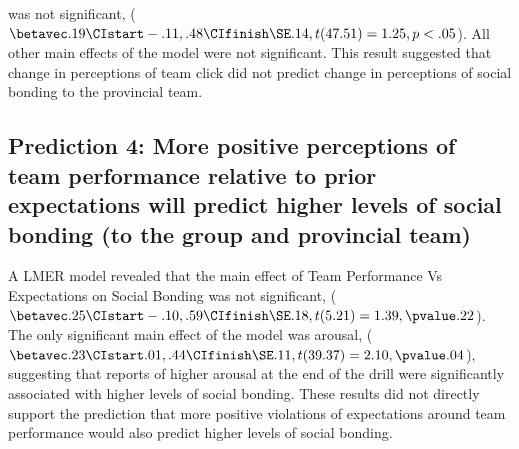 \begin{CJK}{UTF8}{gbsn}
 was not significant, ($\betavec .19 \CIstart -.11, .48 \CIfinish \SE .14, t(47.51) = 1.25, p < .05$).  All other main effects of the model were not significant. This result suggested that change in perceptions of team click did not predict change in perceptions of social bonding to the provincial team.







\subsection{Prediction 4: More positive perceptions of team performance relative to prior expectations will predict higher levels of social bonding (to the group and provincial team)}



A LMER model revealed that the main effect of Team Performance Vs Expectations on Social Bonding was not significant, ($\betavec .25 \CIstart -.10, .59 \CIfinish \SE .18, t(5.21) = 1.39, \pvalue .22$).  The only significant main effect of the model was arousal, ($\betavec .23 \CIstart .01, .44 \CIfinish \SE .11, t(39.37) = 2.10, \pvalue .04$), suggesting that reports of higher arousal at the end of the drill were significantly associated with higher levels of social bonding.  These results did not directly support the prediction that more positive violations of expectations around team performance would also predict higher levels of social bonding.




\end{CJK}
